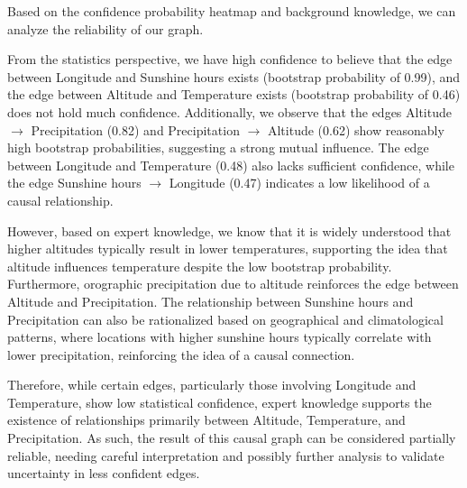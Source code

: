 \documentclass{article}
\begin{document}
Based on the confidence probability heatmap and background knowledge, we can analyze the reliability of our graph.

From the statistics perspective, we have high confidence to believe that the edge between Longitude and Sunshine hours exists (bootstrap probability of 0.99), and the edge between Altitude and Temperature exists (bootstrap probability of 0.46) does not hold much confidence. Additionally, we observe that the edges Altitude $\rightarrow$ Precipitation (0.82) and Precipitation $\rightarrow$ Altitude (0.62) show reasonably high bootstrap probabilities, suggesting a strong mutual influence. The edge between Longitude and Temperature (0.48) also lacks sufficient confidence, while the edge Sunshine hours $\rightarrow$ Longitude (0.47) indicates a low likelihood of a causal relationship.

However, based on expert knowledge, we know that it is widely understood that higher altitudes typically result in lower temperatures, supporting the idea that altitude influences temperature despite the low bootstrap probability. Furthermore, orographic precipitation due to altitude reinforces the edge between Altitude and Precipitation. The relationship between Sunshine hours and Precipitation can also be rationalized based on geographical and climatological patterns, where locations with higher sunshine hours typically correlate with lower precipitation, reinforcing the idea of a causal connection.

Therefore, while certain edges, particularly those involving Longitude and Temperature, show low statistical confidence, expert knowledge supports the existence of relationships primarily between Altitude, Temperature, and Precipitation. As such, the result of this causal graph can be considered partially reliable, needing careful interpretation and possibly further analysis to validate uncertainty in less confident edges.
\end{document}
